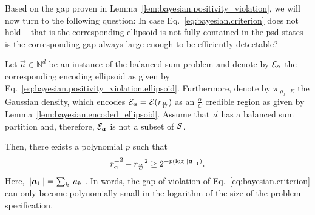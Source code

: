 Based on the gap proven in Lemma~\ref{lem:bayesian.positivity_violation}, we will now turn to the following question:
In case Eq.~\eqref{eq:bayesian.criterion} does not hold -- that is the corresponding ellipsoid is not fully contained in the psd states -- is the corresponding gap always large enough to be efficiently detectable?
\begin{lemma}\label{lem:bayesian.r_separation}
   Let $\vec a \in \mathbb{N}^d$ be an instance of the balanced sum problem and denote by $\mathcal{E}_{{\boldsymbol{a}}}$ the corresponding encoding ellipsoid as given by Eq.~\eqref{eq:bayesian.positivity_violation.ellipsoid}.
  Furthermore, denote by $\pi_{\varrho_0,\Sigma}$ the Gaussian density, which encodes $\mathcal{E}_{{\boldsymbol{a}}} = \mathcal{E}(r_\frac{\alpha}{C})$ as an $\frac{\alpha}{C}$ credible region as given by Lemma~\ref{lem:bayesian.encoded_ellipsoid}.
  Assume that $\vec a$ has a balanced sum partition and, therefore, $\mathcal{E}_{{\boldsymbol{a}}}$ is not a subset of $\mathcal{S}$.

  Then, there exists a polynomial $p$ such that
  \begin{equation}
    {r^+_{\alpha}}^2 - {r_\frac{\alpha}{C}}^2 \ge 2^{-p(\log {\Vert{\boldsymbol{a}}\Vert}_1)}.
  \end{equation}
  Here, ${\Vert{\boldsymbol{a}}_1\Vert} = \sum_k {\vert a_k\vert}$.
  In words, the gap of violation of Eq.~\eqref{eq:bayesian.criterion} can only become polynomially small in the logarithm of the size of the problem specification.
\end{lemma}
